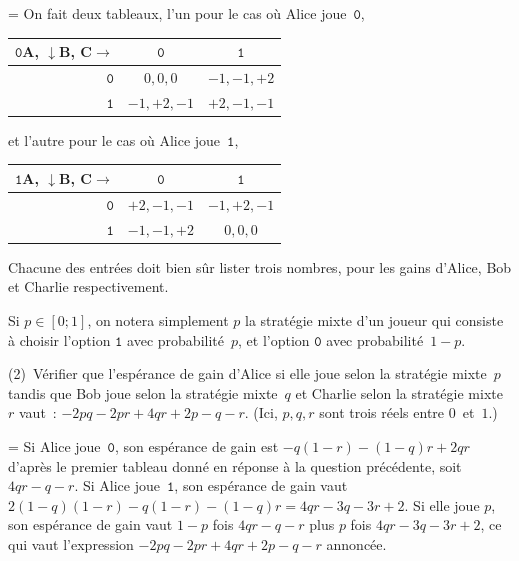 \documentclass[12pt,a4paper]{article}
\theoremstyle{definition}
\newif\ifcorrige
\newenvironment{corrige}%
{\ifcorrige\relax\else\setbox0=\vbox\bgroup\fi%
\smallbreak\noindent{\underbar{\textit{Corrigé.}}\quad}}
{{\hbox{}\nobreak\hfill\checkmark}%
\ifcorrige\relax\else\egroup\fi\par}
\begin{document}
\begin{corrige}
On fait deux tableaux, l'un pour le cas où Alice joue $\mathtt{0}$,
\begin{center}
\begin{tabular}{r|cc}
$\mathtt{0}$A, $\downarrow$B, C$\rightarrow$&$\mathtt{0}$&$\mathtt{1}$\\\hline
$\mathtt{0}$&$0,0,0$&$-1,-1,+2$\\
$\mathtt{1}$&$-1,+2,-1$&$+2,-1,-1$\\
\end{tabular}
\end{center}
et l'autre pour le cas où Alice joue $\mathtt{1}$,
\begin{center}
\begin{tabular}{r|cc}
$\mathtt{1}$A, $\downarrow$B, C$\rightarrow$&$\mathtt{0}$&$\mathtt{1}$\\\hline
$\mathtt{0}$&$+2,-1,-1$&$-1,+2,-1$\\
$\mathtt{1}$&$-1,-1,+2$&$0,0,0$\\
\end{tabular}
\end{center}
Chacune des entrées doit bien sûr lister trois nombres, pour les gains
d'Alice, Bob et Charlie respectivement.
\end{corrige}

\smallbreak

Si $p \in [0;1]$, on notera simplement $p$ la stratégie mixte d'un
joueur qui consiste à choisir l'option $\mathtt{1}$ avec
probabilité $p$, et l'option $\mathtt{0}$ avec probabilité $1-p$.

(2) Vérifier que l'espérance de gain d'Alice si elle joue selon la
stratégie mixte $p$ tandis que Bob joue selon la stratégie mixte $q$
et Charlie selon la stratégie mixte $r$ vaut : $-2pq -2pr +4qr + 2p -
q -r$.  (Ici, $p,q,r$ sont trois réels entre $0$ et $1$.)

\begin{corrige}
Si Alice joue $\mathtt{0}$, son espérance de gain est $-q(1-r) -
(1-q)r + 2qr$ d'après le premier tableau donné en réponse à la
question précédente, soit $4qr - q - r$.  Si Alice joue $\mathtt{1}$,
son espérance de gain vaut $2(1-q)(1-r) -q(1-r) - (1-q)r = 4qr - 3q -
3r + 2$.  Si elle joue $p$, son espérance de gain vaut $1-p$ fois $4qr
- q - r$ plus $p$ fois $4qr - 3q - 3r + 2$, ce qui vaut l'expression
$-2pq -2pr +4qr + 2p - q -r$ annoncée.
\end{corrige}

\smallbreak
\end{document}
